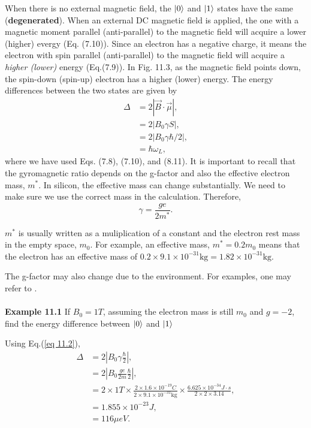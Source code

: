 \documentclass{article}
\begin{document}
When there is no external magnetic field, the $\ket{0}$ and $\ket{1}$ states have the same
(\textbf{degenerated}). When an external DC magnetic field is applied, the one with a 
magnetic moment parallel (anti-parallel) to the magnetic field will acquire a  lower
(higher) evergy (Eq. (7.10)). Since an electron has a negative charge, it means 
the electron with spin parallel (anti-parallel) to the magnetic field will acquire a
\textit{higher (lower)} energy (Eq.(7.9)). In Fig. 11.3, as the magnetic field points down,
the spin-down (spin-up) electron has a higher (lower) energy. The energy differences
between the two states are given by
\begin{align*}\label{eq 11.2}
    \varDelta&=2|\vec{B}\cdot\vec{\mu}|,\\
    &=2|B_0\gamma S|,\\
    &=2|B_0\gamma\hbar/2|,\\
    &=\hbar\omega_L,\tag{11.2}
\end{align*}
where we have used Eqs. (7.8), (7.10), and (8.11). It is important to recall that the gyromagnetic
ratio depends on the g-factor and also the effective electron mass, $m^*$.
In silicon, the effective mass can change substantially. We need to make sure we use
the correct mass in the calculation. Therefore,
\begin{equation}\label{eq 11.3}
    \gamma=\frac{ge}{2m^*}. \tag{11.3}
\end{equation}

$m^*$ is usually written as a muliplication of a constant and the electron rest mass in the
empty space, $m_0$. For example, an effective mass, $m^*=0.2m_0$ means that the electron has an
effective mass of $0.2\times9.1\times10^{-31}\text{kg}=1.82\times10^{-31}\text{kg}$.

The g-factor may also change due to the environment. For examples, one may refer to \cite{7jock2018silicon}.\\\\
\textbf{Example 11.1} If $B_0=1T$, assuming the electron mass is still $m_0$ and $g=-2$, find the
energy difference between $\ket{0}$ and $\ket{1}$

Using Eq.(\ref{eq 11.2}),
\begin{align*}
    \varDelta&=2|B_0\gamma\frac{\hbar}{2}|,\\
    &=2|B_0\frac{ge}{2m}\frac{\hbar}{2}|,\\
    &=2\times1T\times\frac{2\times1.6\times10^{-19}C}{2\times9.1\times10^{-31}\text{kg}}\times
    \frac{6.625\times10^{-34}J\cdot s}{2\times2\times3.14},\\
    &=1.855\times10^{-23}J,\\
    &=116\mu eV.
\end{align*}
\end{document}
